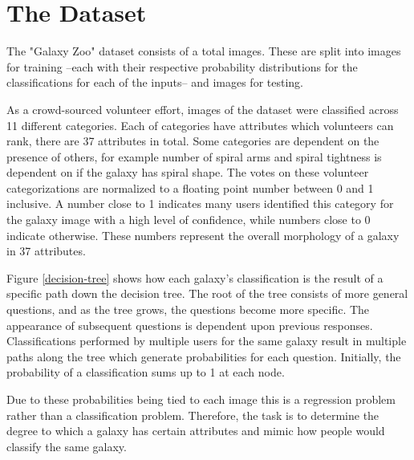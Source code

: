\section{The Dataset}

The "Galaxy Zoo" dataset consists of a total  images. These are split into  images for training --each with their respective probability distributions for the classifications for each of the inputs-- and  images for testing.

As a crowd-sourced volunteer effort, images of the dataset were classified across 11 different categories. Each of categories have attributes which volunteers can rank, there are 37 attributes in total. Some categories are dependent on the presence of others, for example number of spiral arms and spiral tightness is dependent on if the galaxy has spiral shape. The votes on these volunteer categorizations are normalized to a floating point number between 0 and 1 inclusive. A number close to 1 indicates many users identified this category for the galaxy image with a high level of confidence, while numbers close to 0 indicate otherwise. These numbers represent the overall morphology of a galaxy in 37 attributes.

Figure \ref{decision-tree} shows how each galaxy's classification is the result of a specific path down the decision tree. The root of the tree consists of more general questions, and as the tree grows, the questions become more specific. The appearance of subsequent questions is dependent upon previous responses. Classifications performed by multiple users for the same galaxy result in multiple paths along the tree which generate probabilities for each question. Initially, the probability of a classification sums up to 1 at each node.

Due to these probabilities being tied to each image this is a regression problem rather than a classification problem. Therefore, the task is to determine the degree to which a galaxy has certain attributes and mimic how people would classify the same galaxy.

